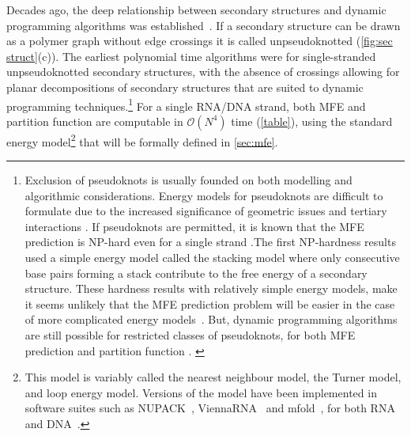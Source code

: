 Decades ago, the deep relationship between secondary structures and dynamic programming algorithms was established~\cite{zukeroptimal,zukerrna, nussinov1978algorithms, nussinov1980fast,waterman1986rapid, mccaskill1990equilibrium}.  
If a secondary structure can be drawn as a polymer graph  without edge crossings it is called unpseudoknotted  (\cref{fig:sec struct}(c)).
The earliest polynomial time algorithms were for single-stranded  unpseudoknotted secondary structures, with the absence of crossings allowing for planar decompositions of secondary structures that are suited  to dynamic programming techniques.\footnote{Exclusion of pseudoknots is usually founded on both modelling and algorithmic considerations. Energy models for pseudoknots are difficult to formulate due to the increased significance of geometric issues and tertiary interactions \cite{dirks2007thermodynamic}. If pseudoknots are permitted, it is known that the MFE prediction is NP-hard even for a single strand \cite{akutsu2000dynamic,lyngso2000pseudoknots,lyngso2000rna}.The first NP-hardness results \cite{akutsu2000dynamic,lyngso2000pseudoknots} used a simple energy model called the stacking model where only consecutive base pairs forming a stack contribute to the free energy of a secondary structure. These hardness results with relatively simple energy models, make it seems unlikely that the MFE prediction problem will be easier in the case of more complicated energy models~\cite{condon2021predicting}. But, dynamic programming algorithms are still possible for restricted classes of pseudoknots, for both MFE prediction \cite{rivas1999dynamic, uemura1999tree, chen2009n, jabbari2018knotty, reeder2004design} and partition function \cite{dirks2003partition, dirks2004algorithm}. \label{ft:pseudoknot}}  
For a single RNA/DNA strand, both MFE and partition function are computable in $\mathcal{O}(N^4)$ time (\cref{table}),  using the standard  energy model\footnote{This model is variably called the nearest neighbour model, the Turner model, and loop energy model. 
Versions of the model have been implemented in software suites such as NUPACK~\cite{dirks2007thermodynamic,dirks2004algorithm,fornace2020unified}, ViennaRNA~\cite{viennaRNA} and mfold~\cite{mfold}, for both RNA and DNA~\cite{santalucia1998unified,santa}.} that will be formally defined in \cref{sec:mfe}. 

